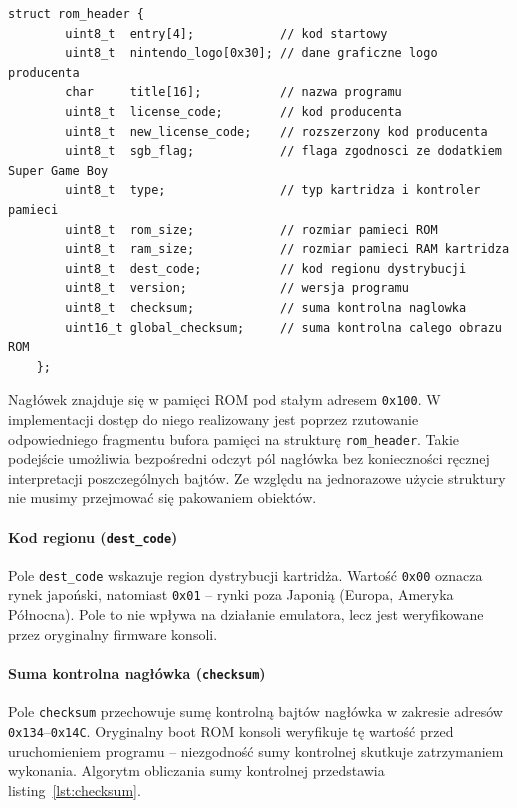 \documentclass{article}
\begin{document}
\begin{lstlisting}[style=cpp, label={lst:rom_header}, caption={Struktura \texttt{rom\_header}}]
	struct rom_header {
		uint8_t  entry[4];            // kod startowy
		uint8_t  nintendo_logo[0x30]; // dane graficzne logo producenta
		char     title[16];           // nazwa programu
		uint8_t  license_code;        // kod producenta
		uint8_t  new_license_code;    // rozszerzony kod producenta
		uint8_t  sgb_flag;            // flaga zgodnosci ze dodatkiem Super Game Boy
		uint8_t  type;                // typ kartridza i kontroler pamieci
		uint8_t  rom_size;            // rozmiar pamieci ROM
		uint8_t  ram_size;            // rozmiar pamieci RAM kartridza
		uint8_t  dest_code;           // kod regionu dystrybucji
		uint8_t  version;             // wersja programu
		uint8_t  checksum;            // suma kontrolna naglowka
		uint16_t global_checksum;     // suma kontrolna calego obrazu ROM
	};
\end{lstlisting}

Nagłówek znajduje się w pamięci ROM pod stałym adresem \texttt{0x100}. W implementacji dostęp do niego realizowany jest poprzez rzutowanie odpowiedniego fragmentu bufora pamięci na strukturę \texttt{rom\_header}. Takie podejście umożliwia bezpośredni odczyt pól nagłówka bez konieczności ręcznej interpretacji poszczególnych bajtów. Ze względu na jednorazowe użycie struktury nie musimy przejmować się pakowaniem obiektów.

\paragraph{Kod regionu (\texttt{dest\_code})}
Pole \texttt{dest\_code} wskazuje region dystrybucji kartridża. Wartość \texttt{0x00}
oznacza rynek japoński, natomiast \texttt{0x01} -- rynki poza Japonią (Europa,
Ameryka Północna). Pole to nie wpływa na działanie emulatora, lecz jest
weryfikowane przez oryginalny firmware konsoli.

\paragraph{Suma kontrolna nagłówka (\texttt{checksum})}
Pole \texttt{checksum} przechowuje sumę kontrolną bajtów nagłówka w zakresie
adresów \texttt{0x134}--\texttt{0x14C}. Oryginalny boot ROM konsoli weryfikuje
tę wartość przed uruchomieniem programu -- niezgodność sumy kontrolnej skutkuje
zatrzymaniem wykonania. Algorytm obliczania sumy kontrolnej przedstawia
listing~\ref{lst:checksum}.
\end{document}
